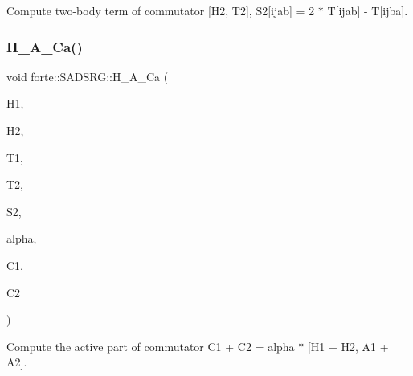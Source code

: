Compute two-\/body term of commutator \mbox{[}H2, T2\mbox{]}, S2\mbox{[}ijab\mbox{]} = 2 $\ast$ T\mbox{[}ijab\mbox{]} -\/ T\mbox{[}ijba\mbox{]}. 

\mbox{\label{classforte_1_1_s_a_d_s_r_g_a220a2a913a49b18bc30167ba32a0c722}} 
\subsubsection{\texorpdfstring{H\+\_\+\+A\+\_\+\+Ca()}{H\_A\_Ca()}}
{\footnotesize\ttfamily void forte\+::\+S\+A\+D\+S\+R\+G\+::\+H\+\_\+\+A\+\_\+\+Ca (\begin{DoxyParamCaption}\item[{Blocked\+Tensor \&}]{H1,  }\item[{Blocked\+Tensor \&}]{H2,  }\item[{Blocked\+Tensor \&}]{T1,  }\item[{Blocked\+Tensor \&}]{T2,  }\item[{Blocked\+Tensor \&}]{S2,  }\item[{const double \&}]{alpha,  }\item[{Blocked\+Tensor \&}]{C1,  }\item[{Blocked\+Tensor \&}]{C2 }\end{DoxyParamCaption})\hspace{0.3cm}{\ttfamily [protected]}}



Compute the active part of commutator C1 + C2 = alpha $\ast$ \mbox{[}H1 + H2, A1 + A2\mbox{]}. 

\mbox{\label{classforte_1_1_s_a_d_s_r_g_a20d36dbff8733f76b980770ec9008ec0}} 
